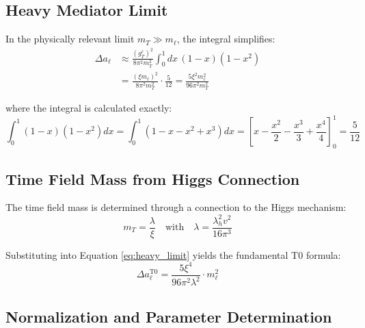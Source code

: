 \documentclass[12pt,a4paper]{article}
\theoremstyle{definition}
\begin{document}
	\subsection{Heavy Mediator Limit}
	
	In the physically relevant limit $m_T \gg m_\ell$, the integral simplifies:
	\begin{align}
		\Delta a_\ell &\approx \frac{(g_T^\ell)^2}{8\pi^2 m_T^2} \int_0^1 dx \, (1-x)(1-x^2) \label{eq:heavy_limit}\\
		&= \frac{(\xi m_\ell)^2}{8\pi^2 m_T^2} \cdot \frac{5}{12} = \frac{5\xi^2 m_\ell^2}{96\pi^2 m_T^2}
	\end{align}
	
	where the integral is calculated exactly:
	\[
	\int_0^1 (1-x)(1-x^2) dx = \int_0^1 (1 - x - x^2 + x^3) dx = \left[x - \frac{x^2}{2} - \frac{x^3}{3} + \frac{x^4}{4}\right]_0^1 = \frac{5}{12}
	\]
	
	\subsection{Time Field Mass from Higgs Connection}
	
	The time field mass is determined through a connection to the Higgs mechanism\cite{pascher_higgs_connection_2025}:
	\begin{equation}
		m_T = \frac{\lambda}{\xi} \quad \text{with} \quad \lambda = \frac{\lambda_h^2 v^2}{16\pi^3}
		\label{eq:higgs_connection}
	\end{equation}
	
	Substituting into Equation \eqref{eq:heavy_limit} yields the fundamental T0 formula:
	\begin{equation}
		\Delta a_\ell^{\text{T0}} = \frac{5\xi^4}{96\pi^2\lambda^2} \cdot m_\ell^2
		\label{eq:t0_fundamental_formula}
	\end{equation}
	
	\subsection{Normalization and Parameter Determination}
	
\end{document}

